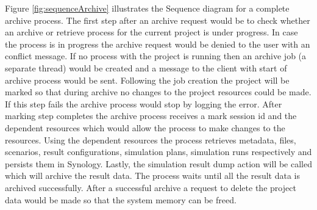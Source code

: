 Figure \ref{fig:sequenceArchive} illustrates the Sequence diagram for a complete archive process. The first step after an archive request would be to check
whether an archive or retrieve process for the current project is under progress. In case the process is in progress the archive request would be denied to the
user with an conflict message. If no process with the project is running then an archive job (a separate thread) would be created and a message to the client with start of archive process would be
sent. Following the job creation the project will be marked so that during archive no changes to the project resources could be made. If this step fails the archive 
process would stop by logging the error. After marking step completes the archive process receives a mark session id and the dependent resources which would allow the process to make
changes to the resources. Using the dependent resources the process retrieves metadata, files, scenarios, result configurations, simulation plans, simulation runs 
respectively and persists them in Synology. Lastly, the simulation result dump action will be called which will archive the result data. The process waits until
all the result data is archived successfully. After a successful archive a request to delete the project data would be made so that the system memory can be freed.
 